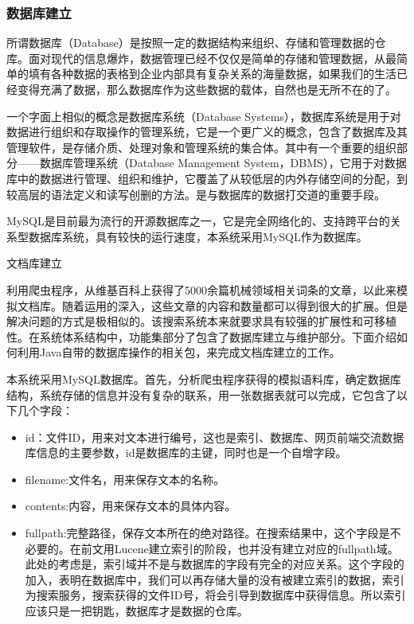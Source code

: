 \documentclass[12pt,a4paper]{article}
\begin{document}
	\subsubsection{数据库建立}
	所谓数据库（{\Times Database}）是按照一定的数据结构来组织、存储和管理数据的仓库。面对现代的信息爆炸，数据管理已经不仅仅是简单的存储和管理数据，从最简单的填有各种数据的表格到企业内部具有复杂关系的海量数据，如果我们的生活已经变得充满了数据，那么数据库作为这些数据的载体，自然也是无所不在的了。
	
	一个字面上相似的概念是数据库系统（{\Times Database Systems}），数据库系统是用于对数据进行组织和存取操作的管理系统，它是一个更广义的概念，包含了数据库及其管理软件，是存储介质、处理对象和管理系统的集合体。其中有一个重要的组织部分——数据库管理系统（{\Times Database Management System}，{\Times DBMS}），它用于对数据库中的数据进行管理、组织和维护，它覆盖了从较低层的内外存储空间的分配，到较高层的语法定义和读写创删的方法。是与数据库的数据打交道的重要手段。
	
	{\Times MySQL}是目前最为流行的开源数据库之一，它是完全网络化的、支持跨平台的关系型数据库系统，具有较快的运行速度，本系统采用{\Times MySQL}作为数据库。
			
	文档库建立
	
	利用爬虫程序，从维基百科上获得了5000余篇机械领域相关词条的文章，以此来模拟文档库。随着运用的深入，这些文章的内容和数量都可以得到很大的扩展。但是解决问题的方式是极相似的。该搜索系统本来就要求具有较强的扩展性和可移植性。在系统体系结构中，功能集部分了包含了数据库建立与维护部分。下面介绍如何利用{\Times Java}自带的数据库操作的相关包，来完成文档库建立的工作。
	
	本系统采用{\Times MySQL}数据库。首先，分析爬虫程序获得的模拟语料库，确定数据库结构，系统存储的信息并没有复杂的联系，用一张数据表就可以完成，它包含了以下几个字段：
	\begin{itemize}
		\item
	{\Times id}：文件{\Times ID}，用来对文本进行编号，这也是索引、数据库、网页前端交流数据库信息的主要参数，{\Times id}是数据库的主键，同时也是一个自增字段。
		\item
	{\Times filename}:文件名，用来保存文本的名称。
		\item
	{\Times contents}:内容，用来保存文本的具体内容。
		\item
	{\Times fullpath}:完整路径，保存文本所在的绝对路径。在搜索结果中，这个字段是不必要的。在前文用{\Times Lucene}建立索引的阶段，也并没有建立对应的{\Times fullpath}域。此处的考虑是，索引域并不是与数据库的字段有完全的对应关系。这个字段的加入，表明在数据库中，我们可以再存储大量的没有被建立索引的数据，索引为搜索服务，搜索获得的文件{\Times ID}号，将会引导到数据库中获得信息。所以索引应该只是一把钥匙，数据库才是数据的仓库。
	\end{itemize}
	
\end{document}
